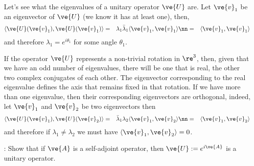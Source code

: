 {Let's see what the eigenvalues of a unitary operator $\ve{U}$ are.
Let $\ve{v}_1$ be an eigenvector of $\ve{U}$ (we know it has at least one),
then,
\begin{eqnarray}
  \langle \ve{U}(\ve{v}_1), \ve{U}(\ve{v}_1) \rangle  
               &=& \lambda_1 \bar{\lambda}_1 \langle \ve{v}_1,\ve{v}_1 \rangle  \nn
               &=& \langle \ve{v}_1,\ve{v}_1 \rangle 
\end{eqnarray}
%
and therefore $\lambda_1 = e^{i \theta_1}$ for some angle $\theta_1$.

If the operator $\ve{U}$ represents a non-trivial rotation in $\re^3$, then, given that we have an 
odd number of eigenvalues, there will be one that is real, the other two complex conjugates of each other.
The eigenvector corresponding to the real eigenvalue defines the axis that remains fixed in that rotation.
If we have more than one eigenvalue, then their corresponding eigenvectors
are orthogonal, indeed, let $\ve{v}_1$ and $\ve{v}_2$ be two eigenvectors
then
\begin{eqnarray}
  \langle \ve{U}(\ve{v}_1), \ve{U}(\ve{v}_2) \rangle 
               &=&  \bar{\lambda}_1 \lambda_2 \langle \ve{v}_1,\ve{v}_2 \rangle \nn
               &=& \langle \ve{v}_1,\ve{v}_2 \rangle 
\end{eqnarray}
%
and therefore if $\lambda_1 \neq \lambda_2$ we must have 
$\langle \ve{v}_1,\ve{v}_2 \rangle =0$.

\ejer:
Show that if $\ve{A}$ is a self-adjoint operator, then
$\ve{U} := e^{i\ve{A}}$ is a unitary operator.



}
